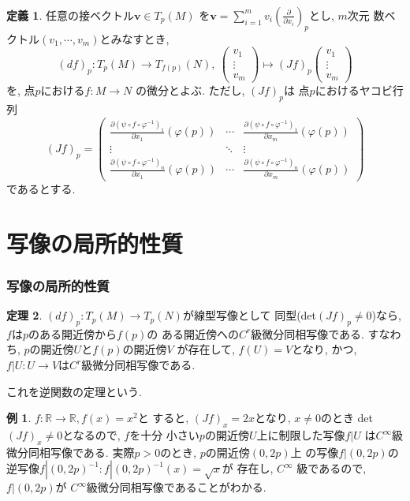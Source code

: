 \documentclass[dvipdfmx,cjk]{beamer}
\theoremstyle{definition}
\newtheorem{ex}{\textbf{ 例 }}
\newtheorem{dfn}{\textbf{ 定義 }}
\newtheorem{thm}[dfn]{\textbf{ 定理 }}
\begin{document}
\begin{frame}
  \frametitle{}
  \begin{dfn}\label{def:differential}
    任意の接ベクトル$\boldsymbol{v}\in T_p(M)$
    を$\boldsymbol{v}=
    \sum_{i=1}^{m}v_i\left(\frac{\partial}
    {\partial x_i}\right)_p$とし, $m$次元
    数ベクトル$(v_1,\cdots ,v_m)$とみなすとき, 
     $$(df)_p:T_p(M)\to T_{f(p)}(N),\ 
    \begin{pmatrix}
      v_1\\
      \vdots \\
      v_m
    \end{pmatrix}
    \mapsto
    (Jf)_p
    \begin{pmatrix}
      v_1\\
      \vdots \\
      v_m
    \end{pmatrix}$$
    を, 点$p$における$f:M\to N$
    の微分とよぶ. ただし, $(Jf)_p$は
    点$p$におけるヤコビ行列
    $$(Jf)_p=
    \left(
    \begin{array}{ccc}
      \frac{\partial (\psi\circ f\circ \varphi^{-1})_1}{\partial x_1}(\varphi(p))&\cdots &\frac{\partial (\psi\circ f\circ \varphi^{-1})_1}{\partial x_m}(\varphi(p))\\
      \vdots &\ddots& \vdots \\
      \frac{\partial (\psi\circ f\circ \varphi^{-1})_n}{\partial x_1}(\varphi(p))&\cdots &\frac{\partial (\psi\circ f\circ \varphi^{-1})_n}{\partial x_m}(\varphi(p)) 
    \end{array} 
    \right)$$
    であるとする. 
  \end{dfn}
\end{frame}

\section{写像の局所的性質}
\begin{frame}
  \frametitle{写像の局所的性質}
  \begin{thm}\label{theo:f^(-1)theorem}
    $(df)_p:T_p(M)\to T_p(N)$が線型写像として
    同型(det$(Jf)_p\neq 0$)なら, $f$は$p$のある開近傍から$f(p)$の
    ある開近傍への$C^r$級微分同相写像である. 
    すなわち, $p$の開近傍$U$と$f(p)$の開近傍$V$
    が存在して, $f(U)=V$となり, かつ, 
    $f|U:U \to V$は$C^r$級微分同相写像である. 
  \end{thm}
  これを逆関数の定理という. 
  \begin{ex}
    $f:\mathbb{R}\to \mathbb{R}, f(x)=x^2$と
    すると, $(Jf)_x=2x$となり, $x\neq 0$のとき
    det$(Jf)_x\neq 0$となるので, $f$を十分
    小さい$p$の開近傍$U$上に制限した写像$f|U$
    は$C^\infty$級微分同相写像である. 
    実際$p>0$のとき, $p$の開近傍$(0,2p)$上
    の写像$f|(0,2p)$の逆写像$f|(0,2p)^{-1}:
    f|(0,2p)^{-1}(x)=\sqrt{x}$が
    存在し, $C^\infty$
    級であるので, $f|(0,2p)$が
    $C^\infty$級微分同相写像であることがわかる.
  \end{ex}
\end{frame}
\end{document}

